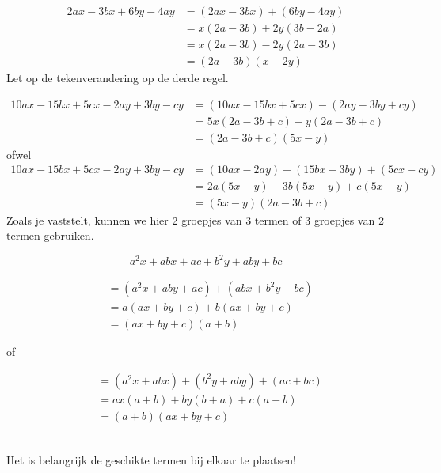 \documentclass{bis}
\begin{document}
\begin{voorbeeld}
\begin{align*}
2ax - 3bx + 6by - 4ay	&= (2ax - 3bx) + (6by - 4ay)\\
                      &= x (2a - 3b) + 2y (3b - 2a)\\
                      &= x (2a - 3b) - 2y (2a - 3b)\\
                      &= (2a - 3b) (x - 2y)
\end{align*}
Let op de tekenverandering op de derde regel.
\end{voorbeeld}

\begin{voorbeeld}
\begin{align*}
10ax - 15bx + 5cx - 2ay + 3by - cy &= (10ax - 15bx + 5cx) - (2ay - 3by + cy)\\
                                   &= 5x (2a - 3b + c) - y (2a - 3b + c)\\
                                   &= (2a - 3b + c) (5x - y)
\end{align*}
ofwel
\begin{align*}
10ax - 15bx + 5cx - 2ay + 3by - cy &= (10ax - 2ay) - (15bx - 3by) + (5cx - cy)\\
                                   &= 2a (5x - y) - 3b (5x - y) + c (5x - y)\\
                                   &= (5x - y) (2a - 3b + c)
\end{align*}
Zoals je vaststelt, kunnen we hier 2 groepjes van 3 termen of 3 groepjes van 2 termen gebruiken.
\end{voorbeeld}

\begin{voorbeeld}
\[a^2x + abx + ac + b^2y + aby + bc\]

\begin{minipage}{0.4\textwidth}
\begin{align*}
&= (a^2x + aby + ac) + (abx + b^2y + bc)\\
&= a (ax + by + c) + b (ax + by + c)\\
&= (ax + by + c) (a + b)
\end{align*}
\end{minipage}
\begin{minipage}{0.2\textwidth}
\centering of
\end{minipage}
\begin{minipage}{0.4\textwidth}
\begin{align*}
&=(a^2x + abx) + (b^2y + aby) + (ac + bc)\\
&= ax (a + b) + by (b + a) + c (a + b)\\
&= (a + b) (ax + by + c)
\end{align*}
\end{minipage}\\[0.5cm]
Het is belangrijk de geschikte termen bij elkaar te plaatsen!
\end{voorbeeld}
\end{document}
